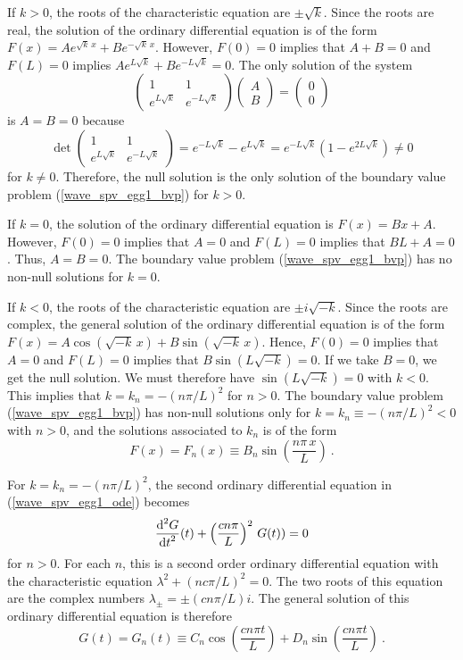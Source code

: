 \begin{egg}
If $k>0$, the roots of the characteristic equation are $\pm \sqrt{k}$.
Since the roots are real, the solution of the ordinary differential
equation is of the form
$\displaystyle F(x) = A e^{\sqrt{k}\,x} + B e^{-\sqrt{k}\, x}$.
However, $F(0)=0$ implies that $A + B=0$ and $F(L)=0$ implies
$\displaystyle A e^{L\sqrt{k}} + B e^{-L\sqrt{k}} = 0$.
The only solution of the system
\[
\begin{pmatrix}
1 & 1 \\ e^{L\sqrt{k}} & e^{-L\sqrt{k}}
\end{pmatrix}
\begin{pmatrix}
A \\ B
\end{pmatrix}
=
\begin{pmatrix}
0 \\ 0
\end{pmatrix}
\]
is $A=B=0$ because
\[
\det
\begin{pmatrix}
1 & 1 \\  e^{L\sqrt{k}} &  e^{-L\sqrt{k}}
\end{pmatrix}
= e^{-L\sqrt{k}} - e^{L\sqrt{k}} =
e^{-L\sqrt{k}}\left(1-e^{2L\sqrt{k}}\right) \neq 0
\]
for $k\neq 0$.  Therefore, the null solution is the only solution
of the boundary value problem (\ref{wave_spv_egg1_bvp}) for $k>0$.

If $k=0$, the solution of the ordinary differential equation is
$F(x)=B x+ A$.  However, $F(0)=0$ implies that $A=0$ and $F(L)=0$
implies that $B L + A = 0$.  Thus, $A = B =0$.  The boundary value problem
(\ref{wave_spv_egg1_bvp}) has no non-null solutions for $k =0$.

If $k<0$, the roots of the characteristic equation are $\pm i \sqrt{-k}$.
Since the roots are complex, the general solution of the ordinary
differential equation is of the form $\displaystyle
F(x) = A \cos\left(\sqrt{-k}\,x\right) + B \sin\left(\sqrt{-k}\,x\right)$.
Hence, $F(0)=0$ implies that $A =0$ and $F(L)=0$ implies that
$B \sin\left(L\sqrt{-k}\right) = 0$.  If we take $B=0$, we get the
null solution.  We must therefore have
$\sin\left(L\sqrt{-k}\right) = 0$ with $k< 0$.  This implies
that $\displaystyle k = k_n = -\left(n\pi/L\right)^2$ for $n>0$.  The
boundary value problem (\ref{wave_spv_egg1_bvp}) has non-null solutions only for
$\displaystyle k=k_n\equiv -\left(n\pi/L\right)^2<0$ with $n>0$, and
the solutions associated to $k_n$ is of the form
\[
F(x)=F_n(x) \equiv B_n \sin\left(\frac{n\pi\,x}{L}\right) \ .
\]

For $\displaystyle k= k_n=-\left(n\pi/L\right)^2$, the second ordinary
differential equation in (\ref{wave_spv_egg1_ode}) becomes
\[
\frac{\displaystyle \mathrm{d}^{2}{G}} {\displaystyle \mathrm{d}{t}^{2}}(t) + \left(\frac{c n\pi}{L}\right)^2\,G(t)) = 0
\]
for $n>0$.  For each $n$, this is a second order ordinary differential
equation with the characteristic equation
$\displaystyle \lambda^2 +\left(n c\pi/L\right)^2=0$.  The two
roots of this equation are the complex numbers
$\displaystyle \lambda_{\pm} = \pm (c n\pi/L)i$.
The general solution of this ordinary differential equation is therefore
\[
G(t) = G_n(t) \equiv C_n \cos\left(\frac{cn\pi t}{L}\right)
+ D_n \sin\left(\frac{cn\pi t}{L}\right) \  .
\]


\end{egg}
